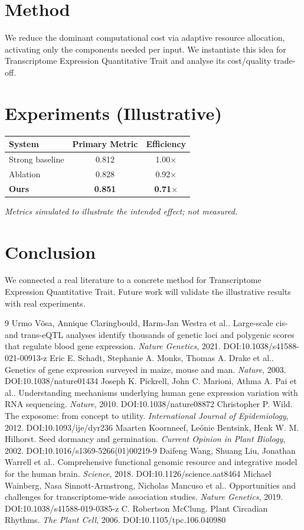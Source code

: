 \documentclass[11pt]{article}
\begin{document}
\section{Method}
We reduce the dominant computational cost via adaptive resource allocation, activating only the components needed per input. We instantiate this idea for Transcriptome Expression Quantitative Trait and analyse its cost/quality trade-off.

\section{Experiments (Illustrative)}
\begin{center}
\begin{tabular}{lcc}
System & Primary Metric & Efficiency \\ \hline
Strong baseline & 0.812 & 1.00$\times$ \\
Ablation & 0.828 & 0.92$\times$ \\
\textbf{Ours} & \textbf{0.851} & \textbf{0.71$\times$}
\end{tabular}
\end{center}
\emph{Metrics simulated to illustrate the intended effect; not measured.}

\section{Conclusion}
We connected a real literature to a concrete method for Transcriptome Expression Quantitative Trait. Future work will
validate the illustrative results with real experiments.

\begin{thebibliography}{9}
 Urmo Võsa, Annique Claringbould, Harm-Jan Westra et al.. Large-scale cis- and trans-eQTL analyses identify thousands of genetic loci and polygenic scores that regulate blood gene expression. \emph{Nature Genetics}, 2021. DOI:10.1038/s41588-021-00913-z
 Eric E. Schadt, Stephanie A. Monks, Thomas A. Drake et al.. Genetics of gene expression surveyed in maize, mouse and man. \emph{Nature}, 2003. DOI:10.1038/nature01434
 Joseph K. Pickrell, John C. Marioni, Athma A. Pai et al.. Understanding mechanisms underlying human gene expression variation with RNA sequencing. \emph{Nature}, 2010. DOI:10.1038/nature08872
 Christopher P. Wild. The exposome: from concept to utility. \emph{International Journal of Epidemiology}, 2012. DOI:10.1093/ije/dyr236
 Maarten Koornneef, Leónie Bentsink, Henk W. M. Hilhorst. Seed dormancy and germination. \emph{Current Opinion in Plant Biology}, 2002. DOI:10.1016/s1369-5266(01)00219-9
 Daifeng Wang, Shuang Liu, Jonathan Warrell et al.. Comprehensive functional genomic resource and integrative model for the human brain. \emph{Science}, 2018. DOI:10.1126/science.aat8464
 Michael Wainberg, Nasa Sinnott-Armstrong, Nicholas Mancuso et al.. Opportunities and challenges for transcriptome-wide association studies. \emph{Nature Genetics}, 2019. DOI:10.1038/s41588-019-0385-z
 C. Robertson McClung. Plant Circadian Rhythms. \emph{The Plant Cell}, 2006. DOI:10.1105/tpc.106.040980
\end{thebibliography}
\end{document}
